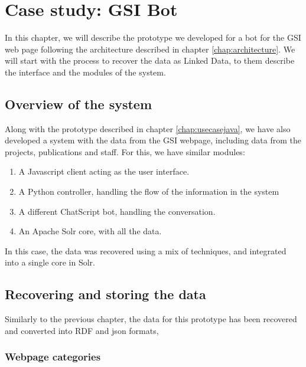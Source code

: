\chapter{Case study: GSI Bot}
\label{chap:usecasegsi}

\begin{chapterintro}

In this chapter, we will describe the prototype we developed for a bot for the GSI web page following the architecture described in chapter \ref{chap:architecture}. We will start with the process to recover the data as Linked Data, to them describe the interface and the modules of the system.
 
\end{chapterintro}

\cleardoublepage

\section{Overview of the system}

Along with the prototype described in chapter \ref{chap:usecasejava}, we have also developed a system with the data from the GSI webpage, including data from the projects, publications and staff. For this, we have similar modules:

\begin{enumerate}
 \item A Javascript client acting as the user interface.
 \item A Python controller, handling the flow of the information in the system
 \item A different ChatScript bot, handling the conversation.
 \item An Apache Solr core, with all the data.
\end{enumerate}

In this case, the data was recovered using a mix of techniques, and integrated into a single core in Solr.

\section{Recovering and storing the data}

Similarly to the previous chapter, the data for this prototype has been recovered and converted into RDF and json formats, 

\subsection{Webpage categories}

